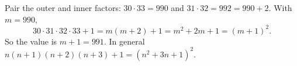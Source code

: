 Pair the outer and inner factors: $30\cdot33=990$ and $31\cdot32=992=990+2$. With $m=990$,
\[30\cdot31\cdot32\cdot33+1=m(m+2)+1=m^2+2m+1=(m+1)^2.\]
So the value is $m+1=\boxed{991}$. In general $n(n+1)(n+2)(n+3)+1=\left(n^2+3n+1\right)^2$.
